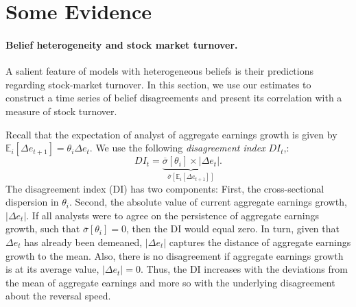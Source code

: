 \section{Some Evidence}

\paragraph{Belief heterogeneity and stock market turnover.}  
A salient feature of models with heterogeneous beliefs is their predictions regarding stock-market turnover. In this section, we use our estimates to construct a time series of belief disagreements and present its correlation with a measure of stock turnover. 

Recall that the expectation of analyst of aggregate earnings growth is given by $\mathbb{E}_i[\Delta e_{t+1}] = \theta_i \Delta e_t$. 
We use the following \textit{disagreement index} $DI_t$,:
\begin{equation}
    DI_t = \underbrace{\overline{\sigma}[\theta_i] \times | \Delta e_t | }_{\overline{\sigma}[\mathbb{E}_i[\Delta e_{t+1}] ] }.
\end{equation}
The disagreement index (DI) has two components: First, the cross-sectional dispersion in $\theta_i$. Second, the absolute value of current aggregate earnings growth, $|\Delta e_t|$. If all analysts were to agree on the persistence of aggregate earnings growth, such that $\overline{\sigma}[\theta_i] = 0$, then the DI would equal zero. In turn, given that $\Delta e_t$ has already been demeaned, $|\Delta e_t|$ captures the distance of aggregate earnings growth to the mean. 
Also, there is no disagreement if aggregate earnings growth is at its average value, $|\Delta e_t| = 0$. Thus, the DI increases with the deviations from the mean of aggregate earnings and more so with the underlying disagreement about the reversal speed.  

